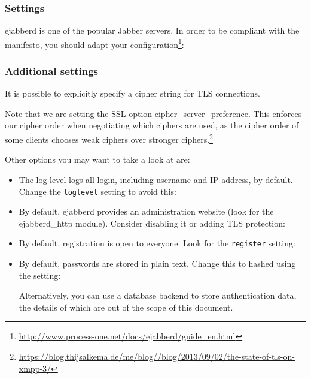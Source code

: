 \subsubsection{Settings}
ejabberd is one of the popular Jabber servers. In order to be compliant
with the manifesto, you should adapt your configuration\footnote{\url{http://www.process-one.net/docs/ejabberd/guide_en.html}}:

% 
\subsubsection{Additional settings}
It is possible to explicitly specify a cipher string for TLS connections.

Note that we are setting the SSL option cipher\_server\_preference. This enforces our cipher order when negotiating which ciphers are used, as the cipher order of some clients chooses weak ciphers over stronger ciphers.\footnote{\url{https://blog.thijsalkema.de/me/blog//blog/2013/09/02/the-state-of-tls-on-xmpp-3/}}

Other options you may want to take a look at are:
\begin{itemize}
\item The log level logs all login, including username and IP address, by default. Change the \texttt{loglevel} setting to avoid this:\\
\item By default, ejabberd provides an administration website (look for the ejabberd\_http module). Consider disabling it or adding TLS protection:\\
\item By default, registration is open to everyone. Look for the \texttt{register} setting:\\
\item By default, passwords are stored in plain text. Change this to hashed using the setting:\\

Alternatively, you can use a database backend to store authentication data, the details of which are out of the scope of this document.
\end{itemize}

